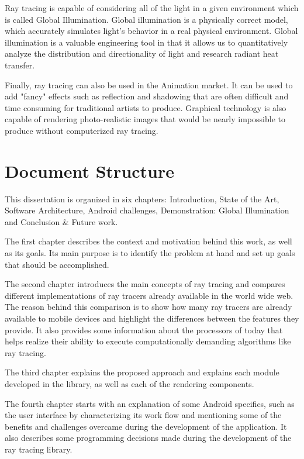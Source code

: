 \par
Ray tracing is capable of considering all of the light in a given environment which is called Global Illumination.
Global illumination is a physically correct model, which accurately simulates light's behavior in a real physical environment.
Global illumination is a valuable engineering tool in that it allows us to quantitatively analyze the distribution and directionality of light and research radiant heat transfer.

\par
Finally, ray tracing can also be used in the Animation market.
It can be used to add "fancy" effects such as reflection and shadowing that are often difficult and time consuming for traditional artists to produce.
Graphical technology is also capable of rendering photo-realistic images that would be nearly impossible to produce without computerized ray tracing.


\section{Document Structure}

\par
This dissertation is organized in six chapters: Introduction, State of the Art, Software Architecture, Android challenges, Demonstration: Global Illumination and Conclusion \& Future work.

\par
The first chapter describes the context and motivation behind this work, as well as its goals.
Its main purpose is to identify the problem at hand and set up goals that should be accomplished.

\par
The second chapter introduces the main concepts of ray tracing and compares different implementations of ray tracers already available in the world wide web.
The reason behind this comparison is to show how many ray tracers are already available to mobile devices and highlight the differences between the features they provide.
It also provides some information about the processors of today that helps realize their ability to execute computationally demanding algorithms like ray tracing.

\par
The third chapter explains the proposed approach and explains each module developed in the library, as well as each of the rendering components.

\par
The fourth chapter starts with an explanation of some Android specifics, such as the user interface by characterizing its work flow and mentioning some of the benefits and challenges overcame during the development of the application.
It also describes some programming decisions made during the development of the ray tracing library.

